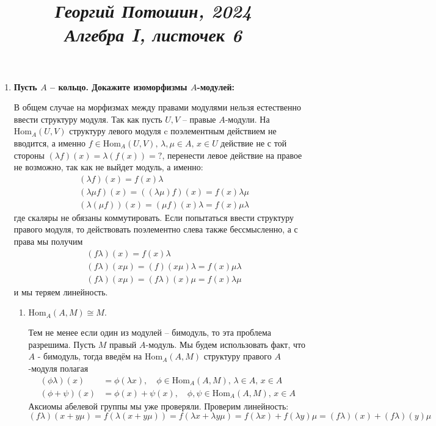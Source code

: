 \documentclass{article}
\title{
\textit{\small{Георгий Потошин, 2024}}\\
\vspace{0.3ex}
\textit{\huge{Алгебра I, листочек 6}}\vspace{1ex}
}
\date{\vspace{-10ex}}
\begin{document}
\maketitle

\begin{enumerate}
    \item \textbf{Пусть $A$ – кольцо. Докажите изоморфизмы $A$-модулей:}

        В общем случае на морфизмах между правами модулями нельзя
        естественно ввести структуру модуля. Так как пусть $U,V$ –
        правые $A$-модули. На $\text{Hom}_A(U,V)$ структуру левого
        модуля c поэлементным действием не вводится, а именно
        $f\in\text{Hom}_A(U,V),\,\lambda,\mu\in A,\,x\in U$
        действие не с той стороны $(\lambda f)(x)=\lambda (f(x))=?$,
        перенести левое действие на правое не возможно, так как
        не выйдет модуль, а именно:
        \begin{align*}
            &(\lambda f)(x) = f(x)\lambda\\
            &(\lambda\mu f)(x) = ((\lambda\mu)f)(x)=f(x)\lambda\mu\\
            &(\lambda(\mu f))(x) = (\mu f)(x)\lambda = f(x)\mu\lambda
        \end{align*}
        где скаляры не обязаны коммутировать. Если попытаться ввести
        структуру правого модуля, то действовать поэлементно слева также
        бессмысленно, а с права мы получим
        \begin{align*}
            &(f\lambda)(x) = f(x)\lambda\\
            &(f\lambda)(x\mu) = (f)(x\mu)\lambda=f(x)\mu\lambda\\
            &(f\lambda)(x\mu) = (f\lambda)(x)\mu = f(x)\lambda\mu
        \end{align*}
        и мы теряем линейность.
        \begin{enumerate}
            \item $\text{Hom}_A(A,M)\cong M.$

                Тем не менее если один из модулей – бимодуль, то эта проблема
                разрешима. Пусть $M$ правый $A$-модуль. Мы будем
                использовать факт, что $A$ - бимодуль, тогда введём на
                $\text{Hom}_A(A,M)$ структуру правого $A$-модуля полагая
                \begin{align*}
                    (\phi\lambda)(x)&=\phi(\lambda x),\quad \phi\in\text{Hom}_A(A,M),\,\lambda\in A,\,x\in A\\
                    (\phi+\psi)(x)&=\phi(x)+\psi(x),\quad \phi,\psi\in\text{Hom}_A(A,M),\,x\in A
                \end{align*}
                Аксиомы абелевой группы мы уже проверяли. Проверим линейность:
                \[(f\lambda)(x+y\mu)=f(\lambda (x+y\mu))=f(\lambda x+\lambda y\mu)=f(\lambda x) + f(\lambda y)\mu=(f\lambda)(x)+(f\lambda)(y)\mu\]


\end{enumerate}
\end{enumerate}
\end{document}
